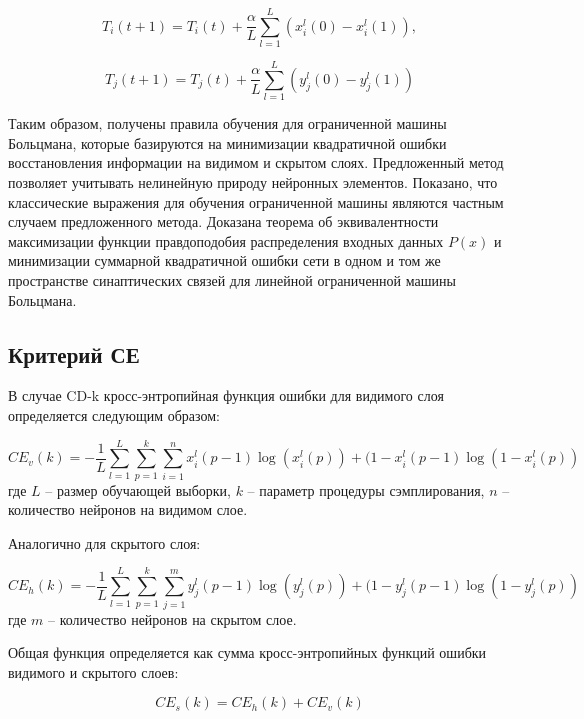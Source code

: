 \begin{equation*}
    T_{i}(t+1)=T_{i}(t)+\frac{\alpha}{L}\sum_{l=1}^L (x_i^l(0)-x_i^l(1)),
\end{equation*}

\begin{equation*}
    T_{j}(t+1)=T_{j}(t)+\frac{\alpha}{L}\sum_{l=1}^L (y_j^l(0)-y_j^l(1))
\end{equation*}

Таким образом, получены правила обучения для ограниченной машины Больцмана, которые базируются на минимизации квадратичной ошибки восстановления информации на видимом и скрытом слоях.  Предложенный метод позволяет учитывать нелинейную природу нейронных элементов. Показано, что классические выражения для обучения ограниченной машины являются частным случаем предложенного метода. Доказана теорема об эквивалентности максимизации функции правдоподобия распределения входных данных $P(x)$ и минимизации суммарной квадратичной ошибки сети в одном и том же пространстве синаптических связей для линейной ограниченной машины Больцмана. 


\subsection{Критерий СЕ}

В случае CD-k кросс-энтропийная функция ошибки для видимого слоя определяется следующим образом:

\begin{equation*}
	CE_v(k) = -\frac{1}{L}\sum_{l=1}^L \sum_{p=1}^k \sum_{i=1}^n x_i^l(p-1)\log(x_i^l(p))+(1-x_i^l(p-1)\log(1-x_i^l(p))
\end{equation*}
где $L$ -- размер обучающей выборки, $k$ -- параметр процедуры сэмплирования, $n$ -- количество нейронов на видимом слое.

Аналогично для скрытого слоя:

\begin{equation*}
	CE_h(k) = -\frac{1}{L}\sum_{l=1}^L \sum_{p=1}^k \sum_{j=1}^m y_j^l(p-1)\log(y_j^l(p))+(1-y_j^l(p-1)\log(1-y_j^l(p))
\end{equation*}
где $m$ -- количество нейронов на скрытом слое.

Общая функция определяется как сумма кросс-энтропийных функций ошибки видимого и скрытого слоев:

\begin{equation}
	CE_s(k) = CE_h(k)+CE_v(k)
\end{equation}

